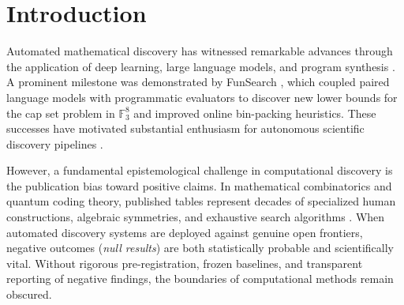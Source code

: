 \documentclass[11pt,a4paper]{article}
\begin{document}
\section{Introduction}
\label{sec:intro}
Automated mathematical discovery has witnessed remarkable advances through the application of deep learning, large language models, and program synthesis \cite{romeraparedes2024nature, schmidt2009distilling, udrescu2020ai}. A prominent milestone was demonstrated by FunSearch \cite{romeraparedes2024nature}, which coupled paired language models with programmatic evaluators to discover new lower bounds for the cap set problem in $\mathbb{F}_3^8$ and improved online bin-packing heuristics. These successes have motivated substantial enthusiasm for autonomous scientific discovery pipelines \cite{cranmer2023interpretable}.

However, a fundamental epistemological challenge in computational discovery is the publication bias toward positive claims. In mathematical combinatorics and quantum coding theory, published tables represent decades of specialized human constructions, algebraic symmetries, and exhaustive search algorithms \cite{gordon2026ljcr, grassl2026codetables, heule2017schur}. When automated discovery systems are deployed against genuine open frontiers, negative outcomes (\emph{null results}) are both statistically probable and scientifically vital. Without rigorous pre-registration, frozen baselines, and transparent reporting of negative findings, the boundaries of computational methods remain obscured.
\end{document}
